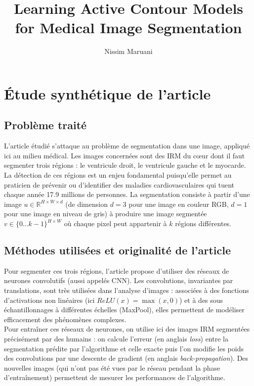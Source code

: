 \documentclass{article}
\title{Learning Active Contour Models for Medical Image Segmentation}
\author{Nissim Maruani}
\begin{document}
\newcommand{\animage}[1][example-image]{\adjustbox{valign=m,vspace=2pt}{\texttt{[image: \#1]}}}

\maketitle
 
\section{Étude synthétique de l'article}


\subsection{Problème traité}

L'article étudié \cite{learningcontour} s'attaque au problème de segmentation dans une image, appliqué ici au milieu médical. Les images concernées sont des IRM du cœur dont il faut segmenter trois régions : le ventricule droit, le ventricule gauche et le myocarde. La détection de ces régions est un enjeu fondamental puisqu'elle permet au praticien de prévenir ou d'identifier des maladies cardiovasculaires qui tuent chaque année 17.9 millions de personnes. La segmentation consiste à partir d'une image $u \in \mathbb{R}^{H \times W \times d}$ (de dimension $d=3$ pour une image en couleur RGB, $d=1$ pour une image en niveau de gris) à produire une image segmentée $v \in \{0... k-1\}^{H \times W}$ où chaque pixel peut appartenir à $k$ régions différentes. 

\subsection{Méthodes utilisées et originalité de l'article}

Pour segmenter ces trois régions, l'article propose d'utiliser des réseaux de neurones convolutifs (aussi appelés CNN). Les convolutions, invariantes par translations, sont très utilisées dans l'analyse d'images : associées à des fonctions d'activations non linéaires (ici $ReLU(x) = \max(x, 0)$) et à des sous échantillonnages à différentes échelles (MaxPool), elles permettent de modéliser efficacement des phénomènes complexes. \\

Pour entraîner ces réseaux de neurones, on utilise ici des images IRM segmentées précisément par des humains : on calcule l'erreur (en anglais \textit{loss}) entre la segmentation prédite par l'algorithme et celle exacte puis l'on modifie les poids des convolutions par une descente de gradient (en anglais \textit{back-propagation}). Des nouvelles images (qui n'ont pas été vues par le réseau pendant la phase d'entraînement) permettent de mesurer les performances de l'algorithme.\\
\end{document}
